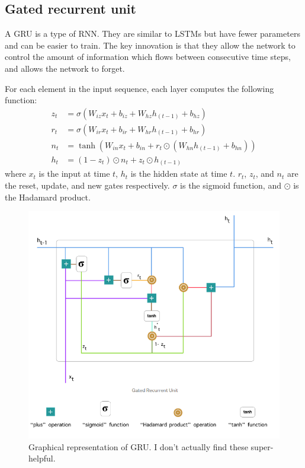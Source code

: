 \documentclass[11pt]{article}
\numberwithin{equation}{section}
\begin{document}
\subsection{Gated recurrent unit}
A GRU is a type of RNN. They are similar to LSTMs but have fewer parameters and can be easier to train. The key innovation is that they allow the network to control the amount of information which flows between consecutive time steps, and allows the network to forget. 

For each element in the input sequence, each layer computes the following function:
\begin{align}
z_t &= \sigma(W_{iz}x_t + b_{iz} + W_{hz} h_{(t-1)} + b_{hz}) \label{eq:gru_update_gate_zt} \\
r_t &= \sigma(W_{ir}x_t + b_{ir} + W_{hr}h_{(t-1)} + b_{hr}) \label{eq:gru_reset_gate_rt} \\
n_t &= \tanh(W_{in} x_t + b_{in} + r_t \odot (W_{hn} h_{(t-1)} + b_{hn}) ) \label{eq:gru_candidate_hidden_state_nt} \\
h_t &= (1-z_t) \odot n_t + z_t \odot h_{(t-1)} \label{eq:update_ht}
\end{align}
where $x_t$ is the input at time $t$, $h_t$ is the hidden state at time $t$. $r_t$, $z_t$, and $n_t$ are the reset, update, and new gates respectively. $\sigma$ is the sigmoid function, and $\odot$ is the Hadamard product.

\begin{figure}
\begin{center}
\includegraphics[width=0.8\columnwidth]{../figures/gru.png}  
\end{center}
\caption{Graphical representation of GRU. I don't actually find these super-helpful.
}
\label{fig:rnn}
\end{figure}
\end{document}
